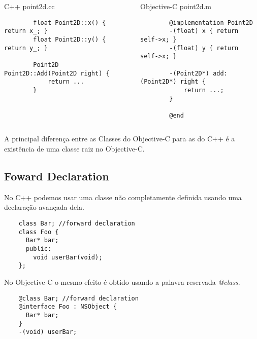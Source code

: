 \documentclass[brazil]{beamer}
\begin{document}
\begin{frame}[fragile]
  \begin{columns}
    \begin{column}{.5\textwidth}
      \begin{center}
        C++
        \vfill
        point2d.cc
      \end{center}
      \lstset{language=C++,basicstyle=\tiny}
      \begin{lstlisting}
        float Point2D::x() { return x_; }
        float Point2D::y() { return y_; }

        Point2D Point2D::Add(Point2D right) {
            return ...
        }
      \end{lstlisting}
    \end{column}
    \begin{column}{.5\textwidth}
      \begin{center}
        Objective-C
        \vfill
        point2d.m
      \end{center}
      \lstset{language=C++,basicstyle=\tiny}
      \begin{lstlisting}
        @implementation Point2D
        -(float) x { return self->x; }
        -(float) y { return self->x; }

        -(Point2D*) add: (Point2D*) right {
            return ...;
        }

        @end
      \end{lstlisting}
    \end{column}
  \end{columns}
\end{frame}

\begin{frame}
  A principal diferença entre as Classes do Objective-C para as do C++ é a existência de uma classe
  raiz no Objective-C.
\end{frame}

\subsection{Foward Declaration}

\begin{frame}[fragile]
  No C++ podemos usar uma classe não completamente definida usando uma declaração avançada dela. \\
  \lstset{language=C++,basicstyle=\tiny}
  \begin{lstlisting}
    class Bar; //forward declaration 
    class Foo { 
      Bar* bar; 
      public:
        void userBar(void);
    };
  \end{lstlisting}
  No Objective-C o mesmo efeito é obtido usando a palavra reservada \textit{@class}.
  \lstset{language=C++,basicstyle=\tiny}
  \begin{lstlisting}
    @class Bar; //forward declaration 
    @interface Foo : NSObject { 
      Bar* bar; 
    }
    -(void) userBar;
  \end{lstlisting}
\end{frame}
\end{document}
